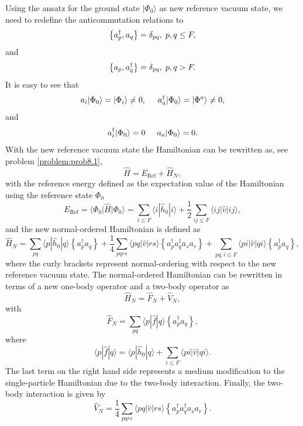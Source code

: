 Using the ansatz for the ground state $\vert \Phi_0\rangle$ as new reference
vacuum state, we need to redefine the anticommutation relations to
\[
\left\{a_p^\dagger, a_q \right\}= \delta_{pq}, \hspace{0.1cm} p, q \leq F,
\]
and
\[
\left\{a_p, a_q^\dagger \right\} = \delta_{pq}, \hspace{0.1cm} p, q > F.
\]
It is easy to see that
\[
        a_i|\Phi_0\rangle = |\Phi_i\rangle\ne 0, \hspace{0.5cm}
        a_a^\dagger|\Phi_0\rangle = |\Phi^a\rangle\ne 0,
\]
and
\[
a_i^\dagger|\Phi_0\rangle = 0 \hspace{0.5cm} a_a|\Phi_0\rangle = 0.
\]
With the new reference vacuum state the Hamiltonian can be rewritten
as, see problem \ref{problem:prob8.1},
\[
\hat{H}=E_{\mathrm{Ref}}+\hat{H}_N,
\]
with the reference energy defined as the expectation value of the
Hamiltonian using the reference state $\Phi_0$
\[
E_{\mathrm{Ref}}=\langle \Phi_0 \vert \hat{H} \vert \Phi_0\rangle =
\sum_{i\le F} \langle i|\hat{h}_0|i\rangle + \frac{1}{2} \sum_{ij\le
  F}\langle ij|\hat{v}|ij\rangle,
\]
and the new normal-ordered Hamiltonian is defined as
\begin{equation}\label{eq:Hnormalorder}
\hat{H}_N = \sum_{pq} \langle p|\hat{h}_0|q\rangle \left\{a^\dagger_p
a_q\right\}+\frac{1}{4} \sum_{pqrs} \langle pq|\hat{v}|rs\rangle
\left\{a^\dagger_p a^\dagger_q a_s a_r\right\}+\sum_{pq,i\le F}
\langle pi|\hat{v}|qi\rangle \left\{a^\dagger_p a_q\right\},
\end{equation}
where the curly brackets represent normal-ordering with respect to the
new reference vacuum state.  The normal-ordered Hamiltonian can be
rewritten in terms of a new one-body operator and a two-body operator
as
\[
\hat{H}_N=\hat{F}_N+\hat{V}_N,
\]
with
\begin{equation}\label{eq:hfn}
\hat{F}_N=\sum_{pq} \langle p|\hat{f}|q\rangle \left\{a^\dagger_pa_q\right\},
\end{equation}
where
\[
\langle p|\hat{f}|q\rangle= \langle p|\hat{h}_0|q\rangle +\sum_{i\le F}
\langle pi|\hat{v}|qi\rangle.
\]
The last term on the right hand side represents a medium modification
to the single-particle Hamiltonian due to the two-body interaction.
Finally, the two-body interaction is given by
\begin{equation}\label{eq:hvn}	     
\hat{V}_N = \frac{1}{4} \sum_{pqrs} \langle pq|\hat{v}|rs\rangle
\left\{a^\dagger_p a^\dagger_q a_s a_r\right\}.
\end{equation}	     

